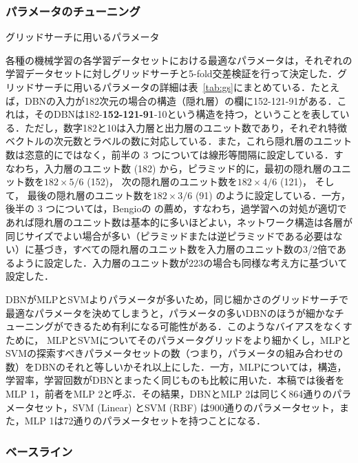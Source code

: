 \documentclass[japanese]{jnlp_1.4}
\begin{document}
\subsubsection{パラメータのチューニング}

\begin{table}[b]
\caption{グリッドサーチに用いるパラメータ}
\label{tab:gs}

\end{table}

各種の機械学習の各学習データセットにおける最適なパラメータは，それぞれの学習データセットに対しグリッドサーチと5-fold交差検証を行って決定した．グリッドサーチに用いるパラメータの詳細は表~\ref{tab:gs}にまとめている．たとえば，DBNの入力が182次元の場合の構造（隠れ層）の欄に152-121-91がある．これは，そのDBNは182-{\bf 152-121-91}-10という構造を持つ，ということを表している．ただし，数字182と10は入力層と出力層のユニット数であり，それぞれ特徴ベクトルの次元数とラベルの数に対応している．また，これら隠れ層のユニット数は恣意的にではなく，前半の 3 つについては線形等間隔に設定している．すなわち，入力層のユニット数 (182) から，ピラミッド的に，最初の隠れ層のユニット数を$182 \times 5/6$ (152)， 次の隠れ層のユニット数を$182 \times 4/6$ (121)， そして， 最後の隠れ層のユニット数を$182 \times 3/6$ (91) のように設定している．一方，後半の 3 つについては，Bengioの\cite{Bengio:12}
の薦め，すなわち，過学習への対処が適切であれば隠れ層のユニット数は基本的に多いほどよい，ネットワーク構造は各層が同じサイズでよい場合が多い（ピラミッドまたは逆ピラミッドである必要はない）に基づき，すべての隠れ層のユニット数を入力層のユニット数の3/2倍であるように設定した．入力層のユニット数が223の場合も同様な考え方に基づいて設定した．

DBNがMLPとSVMよりパラメータが多いため，同じ細かさのグリッドサーチで最適なパラメータを決めてしまうと，パラメータの多いDBNのほうが細かなチューニングができるため有利になる可能性がある．このようなバイアスをなくすために，
MLPとSVMについてそのパラメータグリッドをより細かくし，MLPとSVMの探索すべきパラメータセットの数（つまり，パラメータの組み合わせの数）をDBNのそれと等しいかそれ以上にした．一方，MLPについては，構造，学習率，学習回数がDBNとまったく同じものも比較に用いた．本稿では後者をMLP 1，前者をMLP 2と呼ぶ．その結果，DBNとMLP 2は同じく864通りのパラメータセット，SVM (Linear) とSVM (RBF) は900通りのパラメータセット，また，MLP 1は72通りのパラメータセットを持つことになる．


\subsubsection{ベースライン}
\end{document}
